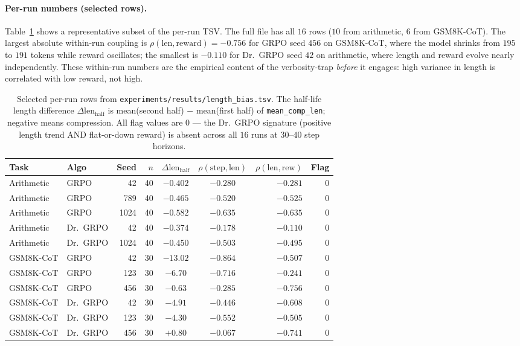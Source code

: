 \documentclass{article}
\begin{document}
\paragraph{Per-run numbers (selected rows).}
Table~\ref{tab:length-bias-per-run} shows a representative subset
of the per-run TSV. The full file has all $16$ rows
($10$ from arithmetic, $6$ from GSM8K-CoT). The largest absolute
within-run coupling is $\rho(\text{len},\text{reward})=-0.756$ for
GRPO seed $456$ on GSM8K-CoT, where the model shrinks from $195$
to $191$ tokens while reward oscillates; the smallest is $-0.110$
for Dr.~GRPO seed $42$ on arithmetic, where length and reward
evolve nearly independently. These within-run numbers are the
empirical content of the verbosity-trap \emph{before} it engages:
high variance in length is correlated with low reward, not high.

\begin{table}[htbp]
\centering
\small
\begin{tabular}{llrrccrr}
\toprule
Task & Algo & Seed & $n$ & $\Delta\text{len}_\text{half}$
   & $\rho(\text{step},\text{len})$ & $\rho(\text{len},\text{rew})$
   & Flag \\
\midrule
Arithmetic   & GRPO     & 42    & 40 & $-0.402$ & $-0.280$  & $-0.281$ & 0 \\
Arithmetic   & GRPO     & 789   & 40 & $-0.465$ & $-0.520$  & $-0.525$ & 0 \\
Arithmetic   & GRPO     & 1024  & 40 & $-0.582$ & $-0.635$  & $-0.635$ & 0 \\
Arithmetic   & Dr.~GRPO & 42    & 40 & $-0.374$ & $-0.178$  & $-0.110$ & 0 \\
Arithmetic   & Dr.~GRPO & 1024  & 40 & $-0.450$ & $-0.503$  & $-0.495$ & 0 \\
GSM8K-CoT    & GRPO     & 42    & 30 & $-13.02$ & $-0.864$  & $-0.507$ & 0 \\
GSM8K-CoT    & GRPO     & 123   & 30 & $-6.70$  & $-0.716$  & $-0.241$ & 0 \\
GSM8K-CoT    & GRPO     & 456   & 30 & $-0.63$  & $-0.285$  & $-0.756$ & 0 \\
GSM8K-CoT    & Dr.~GRPO & 42    & 30 & $-4.91$  & $-0.446$  & $-0.608$ & 0 \\
GSM8K-CoT    & Dr.~GRPO & 123   & 30 & $-4.30$  & $-0.552$  & $-0.505$ & 0 \\
GSM8K-CoT    & Dr.~GRPO & 456   & 30 & $+0.80$  & $-0.067$  & $-0.741$ & 0 \\
\bottomrule
\end{tabular}
\caption{Selected per-run rows from \texttt{experiments/results/length\_bias.tsv}. The
half-life length difference $\Delta\text{len}_\text{half}$ is mean(second half) $-$
mean(first half) of \texttt{mean\_comp\_len}; negative means compression. All flag values
are $0$ --- the Dr.~GRPO signature (positive length trend AND flat-or-down reward) is absent
across all $16$ runs at $30$--$40$ step horizons.}
\label{tab:length-bias-per-run}
\end{table}
\end{document}

